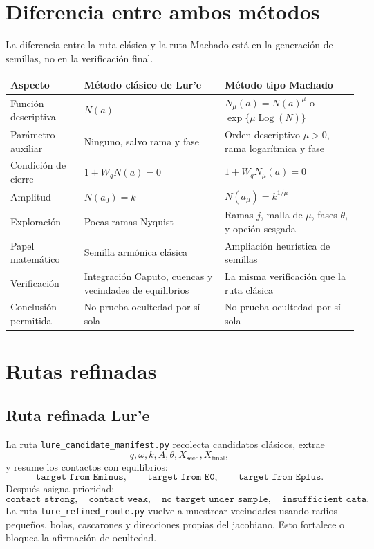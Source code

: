 \documentclass[11pt]{article}
\newcommand{\Log}{\operatorname{Log}}
\begin{document}
\section{Diferencia entre ambos métodos}

La diferencia entre la ruta clásica y la ruta Machado está en la generación de semillas, no en la verificación final.

\begin{center}
\small
\begin{tabular}{@{}L{0.26\textwidth}L{0.31\textwidth}L{0.34\textwidth}@{}}
\toprule
Aspecto & Método clásico de Lur'e & Método tipo Machado \\
\midrule
Función descriptiva & \(N(a)\) & \(N_\mu(a)=N(a)^\mu\) o \(\exp\{\mu\Log(N)\}\) \\
Parámetro auxiliar & Ninguno, salvo rama y fase & Orden descriptivo \(\mu>0\), rama logarítmica y fase \\
Condición de cierre & \(1+W_qN(a)=0\) & \(1+W_qN_\mu(a)=0\) \\
Amplitud & \(N(a_0)=k\) & \(N(a_\mu)=k^{1/\mu}\) \\
Exploración & Pocas ramas Nyquist & Ramas \(j\), malla de \(\mu\), fases \(\theta\), y opción sesgada \\
Papel matemático & Semilla armónica clásica & Ampliación heurística de semillas \\
Verificación & Integración Caputo, cuencas y vecindades de equilibrios & La misma verificación que la ruta clásica \\
Conclusión permitida & No prueba ocultedad por sí sola & No prueba ocultedad por sí sola \\
\bottomrule
\end{tabular}
\end{center}

\section{Rutas refinadas}

\subsection{Ruta refinada Lur'e}

La ruta \texttt{lure\_candidate\_manifest.py} recolecta candidatos clásicos, extrae
\begin{equation}
q,\omega,k,A,\theta,X_{\mathrm{seed}},X_{\mathrm{final}},
\end{equation}
y resume los contactos con equilibrios:
\begin{equation}
\texttt{target\_from\_Eminus},\qquad
\texttt{target\_from\_E0},\qquad
\texttt{target\_from\_Eplus}.
\end{equation}
Después asigna prioridad:
\begin{equation}
\texttt{contact\_strong},\quad
\texttt{contact\_weak},\quad
\texttt{no\_target\_under\_sample},\quad
\texttt{insufficient\_data}.
\end{equation}
La ruta \texttt{lure\_refined\_route.py} vuelve a muestrear vecindades usando radios pequeños, bolas, cascarones y direcciones propias del jacobiano. Esto fortalece o bloquea la afirmación de ocultedad.
\end{document}
